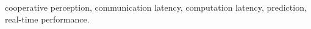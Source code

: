 \documentclass[lettersize,journal]{IEEEtran}
\begin{document}
\begin{abstract}

\end{abstract}

\begin{IEEEkeywords}
cooperative perception, communication latency, computation latency, prediction, real-time performance.
\end{IEEEkeywords}





























\newpage


 
\end{document}

